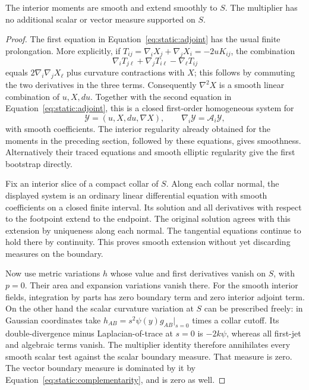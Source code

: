 \begin{lemma}\label{lem:static:smooth-fields}
The interior moments are smooth and extend smoothly to $S$.  The
multiplier has no additional scalar or vector measure supported on
$S$.
\end{lemma}

\begin{proof}
The first equation in Equation~\eqref{eq:static:adjoint} has the usual
finite prolongation.  More explicitly, if
$T_{ij}=\nabla_iX_j+\nabla_jX_i=-2uK_{ij}$, the combination
\[
 \nabla_iT_{j\ell}+\nabla_jT_{i\ell}-\nabla_\ell T_{ij}
\]
equals $2\nabla_i\nabla_jX_\ell$ plus curvature contractions with $X$;
this follows by commuting the two derivatives in the three terms.
Consequently $\nabla^2X$ is a smooth linear combination of
$u,X,du$.  Together with the second equation in
Equation~\eqref{eq:static:adjoint}, this is a closed first-order
homogeneous system for
\[
 \mathcal Y=(u,X,du,\nabla X),\qquad
 \nabla_i\mathcal Y=\mathcal A_i\mathcal Y,
\]
with smooth coefficients.  The interior regularity already obtained
for the moments in the preceding section, followed by these equations,
gives smoothness.  Alternatively their traced equations and smooth
elliptic regularity give the first bootstrap directly.

Fix an interior slice of a compact collar of $S$.  Along each collar
normal, the displayed system is an ordinary linear differential
equation with smooth coefficients on a closed finite interval.  Its
solution and all derivatives with respect to the footpoint extend to
the endpoint.  The original solution agrees with this extension by
uniqueness along each normal.  The tangential equations continue to
hold there by continuity.  This proves smooth extension without yet
discarding measures on the boundary.

Now use metric variations $h$ whose value and first derivatives vanish
on $S$, with $p=0$.  Their area and expansion variations vanish there.
For the smooth interior fields, integration by parts has zero boundary
term and zero interior adjoint term.  On the other hand the scalar
curvature variation at $S$ can be prescribed freely: in Gaussian
coordinates take $h_{AB}=s^2\psi(y)g_{AB}|_{s=0}$ times a collar
cutoff.  Its double-divergence minus Laplacian-of-trace at $s=0$ is
$-2k\psi$, whereas all first-jet and algebraic terms vanish.  The
multiplier identity therefore annihilates every smooth scalar test
against the scalar boundary measure.  That measure is zero.  The
vector boundary measure is dominated by it by
Equation~\eqref{eq:static:complementarity}, and is zero as well.
\end{proof}

